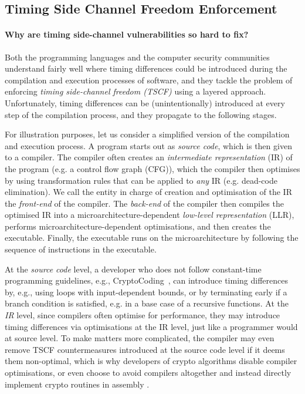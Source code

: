 \subsection{Timing Side Channel Freedom Enforcement}
\paragraph*{Why are timing side-channel vulnerabilities so hard to fix?}
Both the programming languages and the computer security communities understand fairly well where timing differences could be introduced during the compilation and execution processes of software, and they tackle the problem of enforcing \emph{timing side-channel freedom (TSCF)} using a layered approach. 
Unfortunately,
timing differences can be (unintentionally) introduced at every step of the compilation process, and they propagate to the following stages. %

For illustration purposes, let us consider a simplified version of the compilation and execution process. A program starts out as \emph{source code}, which is then given to a compiler. 
The compiler often creates an \emph{intermediate representation} (IR) of the program (e.g. a control flow graph (CFG)), which the compiler then optimises by using %
transformation rules that can be applied to \emph{any} IR (e.g. dead-code elimination). We call the entity in charge of creation and optimisation of the IR the \emph{front-end} of the compiler. The \emph{back-end} of the compiler then compiles the optimised IR into a microarchitecture-dependent \emph{low-level representation} (LLR), performs microarchitecture-dependent optimisations, and then creates the executable. Finally, the executable runs on the microarchitecture by following the sequence of instructions in the executable. 

At the \emph{source code} level, a developer who does not follow constant-time programming guidelines, e.g., CryptoCoding~\cite{CryptoCoding}, can introduce timing differences by, e.g., using loops with input-dependent bounds, or by terminating early if a branch condition is satisfied, e.g. in a base case of a recursive functions. 
At the \emph{IR} level, %
since compilers often optimise for performance, they may introduce timing differences via optimisations at the IR level, just like a programmer would at source level. To make matters more complicated, the compiler may even remove TSCF countermeasures introduced at the source code level if it deems them non-optimal, which is why developers of crypto algorithms disable compiler optimisations, or even choose to avoid compilers altogether and instead directly implement crypto routines in assembly \cite{timing-channel-survey}.

